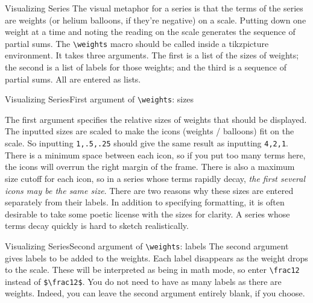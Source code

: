 \documentclass[10pt]{beamer}
\begin{document}
\begin{frame}[fragile]{Visualizing Series}
The visual metaphor for a series is that the terms of the series are weights (or helium balloons, if they're negative) on a scale. Putting down one weight at a time and noting the reading on the scale generates the sequence of partial sums.
\vfill
The  \verb|\weights| macro should be called inside a tikzpicture environment. It takes three arguments. The first is a list of the sizes of weights; the second is a list of labels for those weights; and the third is a sequence of partial sums. All are entered as lists.

\end{frame}
\begin{frame}{Visualizing Series}{First argument of \texttt{\textbackslash weights}: sizes}

The first argument specifies the relative sizes of weights that should be displayed.
\vfill
The inputted sizes are scaled to make the icons (weights / balloons) fit on the scale. So inputting \texttt{1,.5,.25} should give the same result as inputting \texttt{4,2,1}. There is a minimum space between each icon, so if you put too many terms here, the icons will overrun the right margin of the frame. There is also a maximum size cutoff for each icon, so in a series whose terms rapidly decay, \textit{the first several icons may be the same size}.
\vfill
There are two reasons why these sizes are entered separately from their labels. In addition to specifying formatting, it is often desirable to take some poetic license with the sizes for clarity. A series whose terms decay quickly is hard to sketch realistically.

\end{frame}
\begin{frame}{Visualizing Series}{Second argument of \texttt{\textbackslash weights}: labels}
The second argument gives labels to be added to the weights. Each label disappears as the weight drops to the scale.
\vfill
These will be interpreted as being in math mode, so enter \texttt{\textbackslash frac12} instead of \texttt{\$\textbackslash frac12\$}.
\vfill
You do not need to have as many labels as there are weights. Indeed, you can leave the second argument entirely blank, if you choose.
\end{frame}
\end{document}

